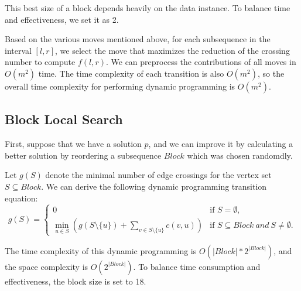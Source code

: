 \documentclass[a4paper,ctexart,UKenglish,cleveref, autoref, thm-restate]{lipics-v2021}
\begin{document}
This best size of a block depends heavily on the data instance.
To balance time and effectiveness, we set it as 2. 

Based on the various moves mentioned above, for each subsequence in the interval $[l, r]$, we select the move that maximizes the reduction of the crossing number to compute $f(l, r)$.
We can preprocess the contributions of all moves in $O(m^2)$ time. 
The time complexity of each transition is also $O(m^2)$, so the overall time complexity for performing dynamic programming is $O(m^2)$.





\subsection{Block Local Search}
First, suppose that we have a solution $p$, and we can improve it by calculating a better solution by reordering a subsequence $Block$ which was chosen randomdly. 

Let $g(S)$ denote the minimal number of edge crossings for the vertex set $S\subseteq Block$. 
We can derive the following dynamic programming transition equation:
$$
g(S) = 
\begin{cases} 
0 & \text{if } S = \emptyset, \\
\min_{u\in S}(g(S\setminus\{u\})+\sum_{v\in S\setminus\{u\}}c(v,u)) & \text{if } S\subseteq Block \ and \  S \neq \emptyset. 
\end{cases}
$$

The time complexity of this dynamic programming is $O(|Block|*2^{|Block|})$, and the space complexity is $O(2^{|Block|})$. To balance time consumption and effectiveness, the block size is set to 18.

\section{}




\end{document}

